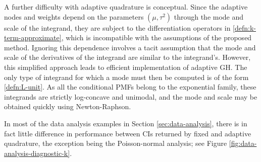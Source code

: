 \documentclass[12pt]{article}
\newcommand{\Y}{Y}
\newcommand{\effect}{\mu}
\newcommand{\comment}[2][red]{%
 \iftoggle{commenttoggle}{%
  {\normalsize{\color{#1}{#2}}\normalsize}%
 }{%
 }%
}
\begin{document}
\begin{enumerate}
  A further difficulty with adaptive quadrature is conceptual. Since
  the adaptive nodes and weights depend on the parameters
  $(\effect,\tau^2)$ through the mode and scale of the integrand, they are subject to
  the differentiation operators in \eqref{defn:k-term-approximate}, which is incompatible with the
  assumptions of the proposed method. Ignoring this dependence
  involves a tacit assumption that the mode and scale of the derivatives of the integrand are similar to the integrand's.  However, this
  simplified approach leads to efficient implementation of adaptive
  GH. The only type of integrand for which a mode must then be computed is
  of the form \eqref{defn:L-unit}. As all the conditional
  PMFs belong to the exponential family, these integrands are strictly
  log-concave and unimodal, and the mode and scale may be obtained
  quickly using Newton-Raphson.

  In most of the data analysis examples in Section
  \ref{sec:data-analysis}, there is in fact little difference in performance
  between CIs returned by fixed and adaptive quadrature, the exception being the Poisson-normal analysis; see Figure \ref{fig:data-analysis-diagnostic-k}.



\end{enumerate}
\end{document}
